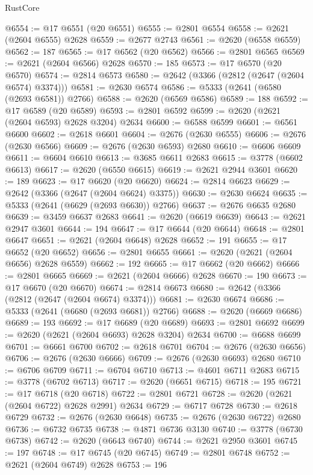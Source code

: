 \begin{lexlean}{RustCore}
\begin{coremodule}
@6554 := @17 @6551 (@20 @6551)
@6555 := @2801 @6554
@6558 := @2621 (@2604 @6555) @2628
@6559 := @2677 @2743
@6561 := @2620 (@6558 @6559)
@6562 := 187
@6565 := @17 @6562 (@20 @6562)
@6566 := @2801 @6565
@6569 := @2621 (@2604 @6566) @2628
@6570 := 185
@6573 := @17 @6570 (@20 @6570)
@6574 := @2814 @6573
@6580 := @2642 (@3366 (@2812 (@2647 (@2604 @6574) @3374)))
@6581 := @2630 @6574
@6586 := @5333 (@2641 (@6580 (@2693 @6581)) @2766)
@6588 := @2620 (@6569 @6586)
@6589 := 188
@6592 := @17 @6589 (@20 @6589)
@6593 := @2801 @6592
@6599 := @2620 (@2621 (@2604 @6593) @2628 @3204) @2634
@6600 := @6588 @6599
@6601 := @6561 @6600
@6602 := @2618 @6601
@6604 := @2676 (@2630 @6555)
@6606 := @2676 (@2630 @6566)
@6609 := @2676 (@2630 @6593) @2680
@6610 := @6606 @6609
@6611 := @6604 @6610
@6613 := @3685 @6611 @2683
@6615 := @3778 (@6602 @6613)
@6617 := @2620 (@6550 @6615)
@6619 := @2621 @2944 @3601
@6620 := 189
@6623 := @17 @6620 (@20 @6620)
@6624 := @2814 @6623
@6629 := @2642 (@3366 (@2647 (@2604 @6624) @3375))
@6630 := @2630 @6624
@6635 := @5333 (@2641 (@6629 (@2693 @6630)) @2766)
@6637 := @2676 @6635 @2680
@6639 := @3459 @6637 @2683
@6641 := @2620 (@6619 @6639)
@6643 := @2621 @2947 @3601
@6644 := 194
@6647 := @17 @6644 (@20 @6644)
@6648 := @2801 @6647
@6651 := @2621 (@2604 @6648) @2628
@6652 := 191
@6655 := @17 @6652 (@20 @6652)
@6656 := @2801 @6655
@6661 := @2620 (@2621 (@2604 @6656) @2628 @6559)
@6662 := 192
@6665 := @17 @6662 (@20 @6662)
@6666 := @2801 @6665
@6669 := @2621 (@2604 @6666) @2628
@6670 := 190
@6673 := @17 @6670 (@20 @6670)
@6674 := @2814 @6673
@6680 := @2642 (@3366 (@2812 (@2647 (@2604 @6674) @3374)))
@6681 := @2630 @6674
@6686 := @5333 (@2641 (@6680 (@2693 @6681)) @2766)
@6688 := @2620 (@6669 @6686)
@6689 := 193
@6692 := @17 @6689 (@20 @6689)
@6693 := @2801 @6692
@6699 := @2620 (@2621 (@2604 @6693) @2628 @3204) @2634
@6700 := @6688 @6699
@6701 := @6661 @6700
@6702 := @2618 @6701
@6704 := @2676 (@2630 @6656)
@6706 := @2676 (@2630 @6666)
@6709 := @2676 (@2630 @6693) @2680
@6710 := @6706 @6709
@6711 := @6704 @6710
@6713 := @4601 @6711 @2683
@6715 := @3778 (@6702 @6713)
@6717 := @2620 (@6651 @6715)
@6718 := 195
@6721 := @17 @6718 (@20 @6718)
@6722 := @2801 @6721
@6728 := @2620 (@2621 (@2604 @6722) @2628 @2991) @2634
@6729 := @6717 @6728
@6730 := @2618 @6729
@6732 := @2676 (@2630 @6648)
@6735 := @2676 (@2630 @6722) @2680
@6736 := @6732 @6735
@6738 := @4871 @6736 @3130
@6740 := @3778 (@6730 @6738)
@6742 := @2620 (@6643 @6740)
@6744 := @2621 @2950 @3601
@6745 := 197
@6748 := @17 @6745 (@20 @6745)
@6749 := @2801 @6748
@6752 := @2621 (@2604 @6749) @2628
@6753 := 196

\end{coremodule}
\end{lexlean}
